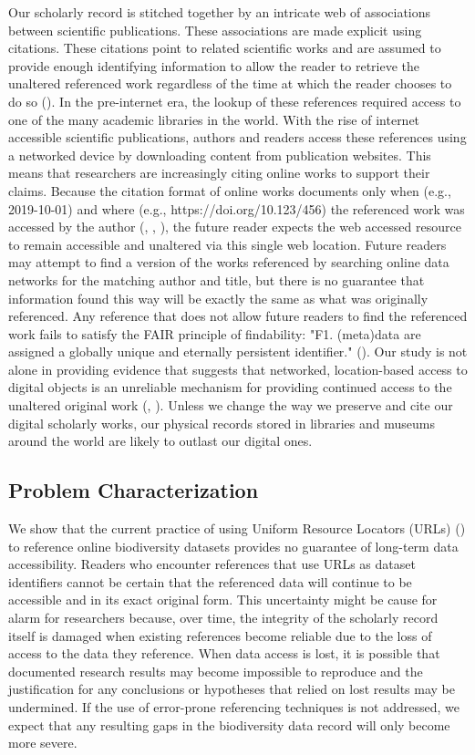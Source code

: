 \documentclass[12pt,letterpaper]{article}
\begin{document}
Our scholarly record is stitched together by an intricate web of associations between scientific publications. These associations are made explicit using citations. These citations point to related scientific works and are assumed to provide enough identifying information to allow the reader to retrieve the unaltered referenced work regardless of the time at which the reader chooses to do so (\cite{Garfield_1964}). In the pre-internet era, the lookup of these references required access to one of the many academic libraries in the world. With the rise of internet accessible scientific publications, authors and readers access these references using a networked device by downloading content from publication websites. This means that researchers are increasingly citing online works to support their claims. Because the citation format of online works documents only when (e.g., 2019-10-01) and where (e.g., https://doi.org/10.123/456) the referenced work was accessed by the author (\cite{gbif_2019}, \cite{idigbio_2016}, \cite{dataone_2012}), the future reader expects the web accessed resource to remain accessible and unaltered via this single web location. Future readers may attempt to find a version of the works referenced by searching online data networks for the matching author and title, but there is no guarantee that information found this way will be exactly the same as what was originally referenced. Any reference that does not allow future readers to find the referenced work fails to satisfy the FAIR principle of findability: "F1. (meta)data are assigned a globally unique and eternally persistent identifier." (\cite{Wilkinson_2016}). Our study is not alone in providing evidence that suggests that networked, location-based access to digital objects is an unreliable mechanism for providing continued access to the unaltered original work (\cite{Vision_2010}, \cite{Klein_2014}). Unless we change the way we preserve and cite our digital scholarly works, our physical records stored in libraries and museums around the world are likely to outlast our digital ones.

\subsection*{Problem Characterization}
We show that the current practice of using Uniform Resource Locators (URLs) (\cite{rfc1738}) to reference online biodiversity datasets provides no guarantee of long-term data accessibility.  Readers who encounter references that use URLs as dataset identifiers cannot be certain that the referenced data will continue to be accessible and in its exact original form. This uncertainty might be cause for alarm for researchers because, over time, the integrity of the scholarly record itself is damaged when existing references become reliable due to the loss of access to the data they reference. When data access is lost, it is possible that documented research results may become impossible to reproduce and the justification for any conclusions or hypotheses that relied on lost results may be undermined. If the use of error-prone referencing techniques is not addressed, we expect that any resulting gaps in the biodiversity data record will only become more severe.
\end{document}

